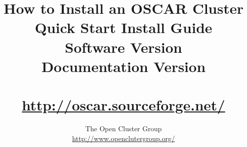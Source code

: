 %
%
%

\title{How to Install an OSCAR Cluster \\
Quick Start Install Guide \\
Software Version \oscarversion \\
Documentation Version \docsversion \\
\ \\
\url{http://oscar.sourceforge.net/} \\
}

\author{The Open Cluster Group \\
\url{http://www.openclutergroup.org/}}
\maketitle
